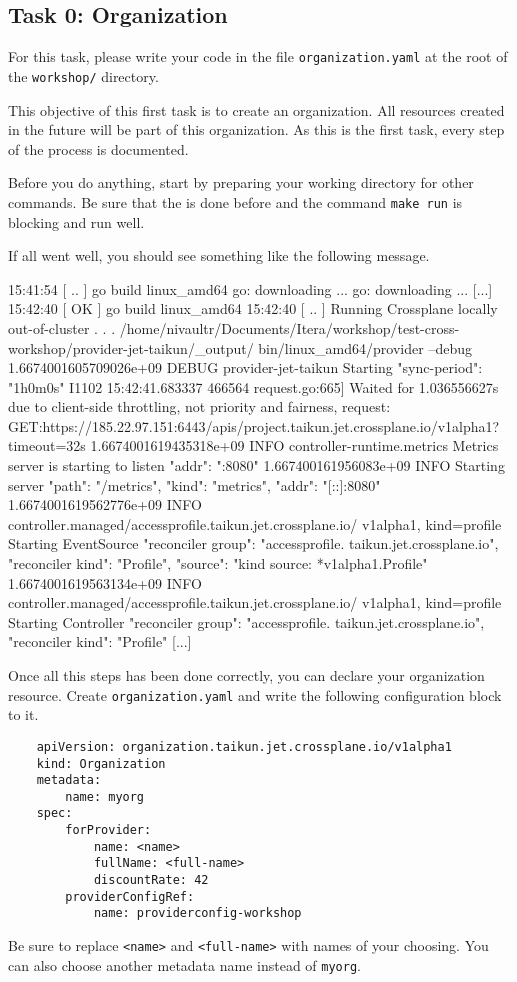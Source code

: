 \subsection{Task 0: Organization}\label{sec:organization}

\begin{note}
For this task, please write your code in the file \texttt{organization.yaml}
at the root of the \texttt{workshop/} directory.
\end{note}

This objective of this first task is to create an organization.
All resources created in the future will be part of this organization.
As this is the first task, every step of the process is documented.

Before you do anything, start by preparing your working directory for other commands.
Be sure that the  is done before and the command \texttt{make run} 
is blocking and run well.

If all went well, you should see something like the following message.
\begin{raw}
15:41:54 [ .. ] go build linux_amd64
go: downloading ...
go: downloading ...
[...]
15:42:40 [ OK ] go build linux_amd64
15:42:40 [ .. ] Running Crossplane locally out-of-cluster . . .
/home/nivaultr/Documents/Itera/workshop/test-cross-workshop/provider-jet-taikun/_output/
bin/linux_amd64/provider --debug
1.6674001605709026e+09 DEBUG provider-jet-taikun Starting {"sync-period": "1h0m0s"}
I1102 15:42:41.683337  466564 request.go:665] Waited for 1.036556627s due to client-side
throttling, not priority and fairness, request:
GET:https://185.22.97.151:6443/apis/project.taikun.jet.crossplane.io/v1alpha1?timeout=32s
1.6674001619435318e+09 INFO controller-runtime.metrics Metrics server is starting to 
listen {"addr": ":8080"}
1.667400161956083e+09 INFO Starting server {"path": "/metrics", "kind": "metrics",
"addr": "[::]:8080"}
1.6674001619562776e+09 INFO controller.managed/accessprofile.taikun.jet.crossplane.io/
v1alpha1, kind=profile  Starting EventSource {"reconciler group": "accessprofile.
taikun.jet.crossplane.io", "reconciler kind": "Profile", "source": "kind source: 
*v1alpha1.Profile"}
1.6674001619563134e+09 INFO controller.managed/accessprofile.taikun.jet.crossplane.io/
v1alpha1, kind=profile  Starting Controller {"reconciler group": "accessprofile.
taikun.jet.crossplane.io", "reconciler kind": "Profile"}
[...]
\end{raw}

Once all this steps has been done correctly, you can declare your organization resource.
Create \texttt{organization.yaml} and write the following configuration block to it.
\begin{verbatim}
    apiVersion: organization.taikun.jet.crossplane.io/v1alpha1
    kind: Organization
    metadata:
        name: myorg
    spec:
        forProvider:
            name: <name>
            fullName: <full-name>
            discountRate: 42
        providerConfigRef:
            name: providerconfig-workshop
\end{verbatim}
Be sure to replace \texttt{<name>} and \texttt{<full-name>} with
names of your choosing.
You can also choose another metadata name instead of \texttt{myorg}.

